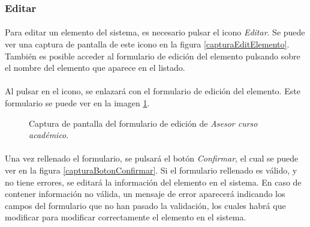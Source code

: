 \subsubsection{Editar}

  \paragraph{}Para editar un elemento del sistema, es necesario pulsar el
  icono \textit{Editar}. Se puede ver una captura de pantalla de este
  icono en la figura \ref{capturaEditElemento}. También es posible acceder
  al formulario de edición del elemento pulsando sobre el nombre del elemento
  que aparece en el listado.

  \paragraph{}Al pulsar en el icono, se enlazará con el formulario de edición
  del elemento. Este formulario se puede ver en la imagen
  \ref{capturaEditAsesorCA}.

  \begin{figure}[!ht]
    \begin{center}
      \caption{Captura de pantalla del formulario de edición de \textit{Asesor curso académico}.}
      \label{capturaEditAsesorCA}
    \end{center}
  \end{figure}

  \paragraph{}Una vez rellenado el formulario, se pulsará el botón
  \textit{Confirmar}, el cual se puede ver en la figura
  \ref{capturaBotonConfirmar}. Si el formulario rellenado es válido, y no tiene
  errores, se editará la información del elemento en el sistema. En caso de
  contener información no válida, un mensaje de error aparecerá indicando los
  campos del formulario que no han pasado la validación, los cuales habrá que
  modificar para modificar correctamente el elemento en el sistema.
